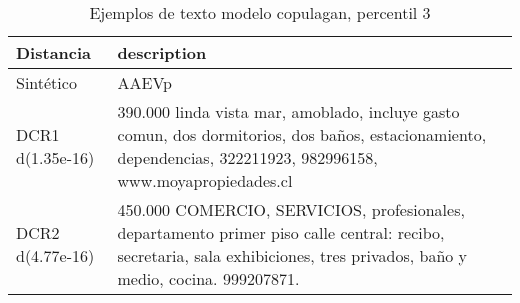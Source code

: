 \begin{table}[H]
\centering
\fontsize{10}{14}\selectfont
\caption{Ejemplos de texto modelo copulagan, percentil 3}
\label{table-example-economicos-b-2-copulagan-3p-text}
\begin{tabular}{|l|m{35em}|}
\hline
\rowcolor[gray]{0.8}
Distancia & description \\
\hline Sintético & AAEVp \\
\hline DCR1 d(1.35e-16) & 390.000 linda vista mar, amoblado, incluye gasto comun, dos dormitorios, dos ba\~nos, estacionamiento, dependencias, 322211923, 982996158, www.moyapropiedades.cl \\
\hline DCR2 d(4.77e-16) & 450.000 COMERCIO, SERVICIOS, profesionales, departamento primer piso calle central: recibo, secretaria, sala exhibiciones, tres privados, ba\~no y medio, cocina. 999207871. \\
\hline
\end{tabular}
\end{table}
